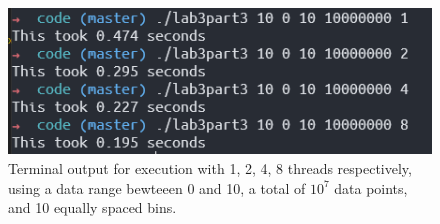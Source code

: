 \begin{figure}[ht]
	\centering
	\includegraphics[width=\textwidth]{graphics/P3_c_terminal_output.PNG}
	\caption{Terminal output for execution with 1, 2, 4, 8 threads respectively,
	using a data range bewteeen 0 and 10, a total of $10^7$ data points, and 10 equally
	spaced bins.}
	\label{fig:lab3part3c}
\end{figure}